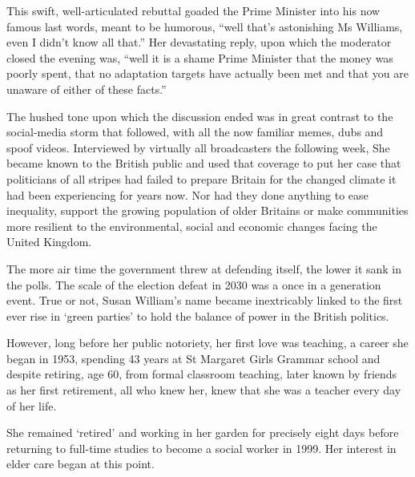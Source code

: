 This swift, well-articulated rebuttal goaded the Prime Minister into his now famous last words, meant to be humorous, ``well that's astonishing Ms Williams, even I didn't know all that.'' Her devastating reply, upon which the moderator closed the evening was, ``well it is a shame Prime Minister that the money was poorly spent, that no adaptation targets have actually been met and that you are unaware of either of these facts.''

The hushed tone upon which the discussion ended was in great contrast to the social-media storm that followed, with all the now familiar memes, dubs and spoof videos. Interviewed by virtually all broadcasters the following week, She became known to the British public and used that coverage to put her case that politicians of all stripes had failed to prepare Britain for the changed climate it had been experiencing for years now. Nor had they done anything to ease inequality, support the growing population of older Britains or make communities more resilient to the environmental, social and economic changes facing the United Kingdom.

The more air time the government threw at defending itself, the lower it sank in the polls. The scale of the election defeat in 2030 was a once in a generation event. True or not, Susan William's name became inextricably linked to the first ever rise in `green parties' to hold the balance of power in the British politics.

However, long before her public notoriety, her first love was teaching, a career she began in 1953, spending 43 years at St Margaret Girls Grammar school and despite retiring, age 60, from formal classroom teaching, later known by friends as her first retirement, all who knew her, knew that she was a teacher every day of her life.

She remained `retired' and working in her garden for precisely eight days before returning to full-time studies to become a social worker in 1999. Her interest in elder care began at this point.

